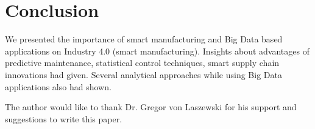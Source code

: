 \documentclass[sigconf]{acmart}
\begin{document}
\section{Conclusion}

We presented the importance of smart manufacturing and Big Data based applications on Industry 4.0 (smart manufacturing). Insights about advantages of predictive maintenance, statistical control techniques, smart supply chain innovations had given. Several analytical approaches while using Big Data applications also had shown.

\begin{acks}

The author would like to thank Dr. Gregor von Laszewski for his support and suggestions to write this paper.

\end{acks}


 
\end{document}
